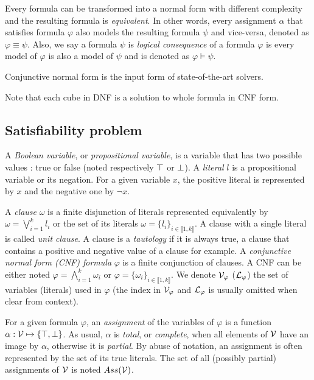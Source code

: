 Every formula can be transformed into a normal form with different complexity and the resulting formula is 
\emph{equivalent}.  
In other words, every assignment $\alpha$ that satisfies formula $\varphi$  also models the resulting formula $\psi$
and vice-versa, denoted as $\varphi \equiv \psi$.
 Also, we say a formula $\psi$ is \emph{logical consequence} of a formula $\varphi$ is every model of $\varphi$
 is also a model of $\psi$ and is denoted as $\varphi \models \psi$.


Conjunctive normal form is the input form of state-of-the-art solvers.
 
Note that each cube in DNF is a solution to whole formula in CNF form.



\subsection{Satisfiability problem}
A \emph{Boolean variable}, or \emph{propositional variable}, is a variable that
has two possible values : true or false (noted respectively $\top$ or $\bot$).
A \emph{literal} $l$ is a propositional variable or its
negation. For a given variable $x$, the positive literal is represented by $x$
and the negative one by $\neg x$.


A \emph{clause} $\omega$ is a finite disjunction of literals represented
equivalently by $\omega = \bigvee_{i=1}^k l_i$ or the set of its literals
$\omega = \{l_i\}_{i \in \llbracket 1,k \rrbracket}$. A clause with a single
literal is called \emph{unit clause}.
A clause is a \emph{tautology} if it is always true, a clause that contains a positive 
and negative value of a clause for example.
A \emph{conjunctive normal form (CNF) formula} $\varphi$ is a finite
conjunction of clauses.  A CNF can be either noted $\varphi = \bigwedge_{i=1}^k
\omega_i$ or $\varphi = \{\omega_i\}_{i \in \llbracket 1,k \rrbracket}$. We
denote $\mathcal{V}_\varphi$ ($\mathcal{L}_\varphi$) the set of variables (literals) used in
$\varphi$ (the index in $\mathcal{V}_\varphi$ and $\mathcal{L}_\varphi$ is usually omitted when
clear from context).

For a given formula $\varphi$, an \emph{assignment} of the variables of
$\varphi$ is a function $\alpha: \mathcal{V} \mapsto \{ \top, \bot \}$.  As usual, $\alpha$ is
\emph{total}, or \emph{complete}, when all elements of $\mathcal{V}$ have an image by
$\alpha$, otherwise it is \emph{partial}. By abuse of notation, an assignment is
often represented by the set of its true literals.  The set of all (possibly
partial) assignments of $\mathcal{V}$ is noted $Ass(\mathcal{V})$.

